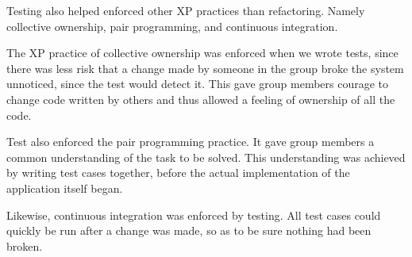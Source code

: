 Testing also helped enforced other XP practices than refactoring. Namely collective ownership, pair programming, and continuous integration. 

The XP practice of collective ownership was enforced when we wrote tests, since there was less risk that a change made by someone in the group broke the system unnoticed, since the test would detect it. This gave group members courage to change code written by others and thus allowed a feeling of ownership of all the code. 

Test also enforced the pair programming practice. It gave group members a common understanding of the task to be solved. This understanding was achieved by writing test cases together, before the actual implementation of the application itself began.

Likewise, continuous integration was enforced by testing. All test cases could quickly be run after a change was made, so as to be sure nothing had been broken.

